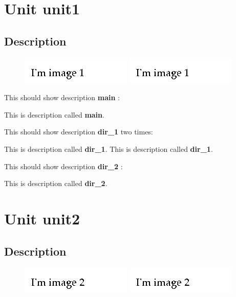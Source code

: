 \documentclass{report}
\begin{document}
\newlength{\tmplength}
\chapter{Unit unit1}
\section{Description}
\begin{figure}
  \ifpdf
    \includegraphics{image_0.png}
  \else
    \includegraphics{image_0.png}
  \fi
\end{figure}


This should show description \textbf{main} :

This is description called \textbf{main}. 

This should show description \textbf{dir{\_}1} two times:

This is description called \textbf{dir{\_}1}.  This is description called \textbf{dir{\_}1}. 

This should show description \textbf{dir{\_}2} :

This is description called \textbf{dir{\_}2}. 
\chapter{Unit unit2}
\section{Description}
\begin{figure}
  \ifpdf
    \includegraphics{image_1.png}
  \else
    \includegraphics{image_1.png}
  \fi
\end{figure}
\end{document}
